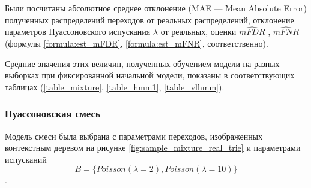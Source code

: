 \documentclass{matmex-diploma-custom}
\begin{document}
Были посчитаны абсолютное среднее отклонение (MAE --- Mean Absolute Error) полученных распределений переходов от реальных распределений, отклонение параметров Пуассоновского испускания $\lambda$ от реальных, оценки $\hat{\textit{mFDR}}$ ,  $\hat{\textit{mFNR}}$ (формулы \ref{formula:est_mFDR}, \ref{formula:est_mFNR}, соответственно).

Средние значения этих величин, полученных обучением модели на разных выборках при фиксированной начальной модели, показаны в соответствующих таблицах (\ref{table_mixture}, \ref{table_hmm1}, \ref{table_vlhmm}).

\subsubsection{Пуассоновская смесь}
Модель смеси была выбрана с параметрами переходов, изображенных контекстным деревом на рисунке \ref{fig:sample_mixture_real_trie} и параметрами испусканий
$$B = \{\textit{Poisson}(\lambda=2), \textit{Poisson}(\lambda=10)\}$$.
\end{document}
